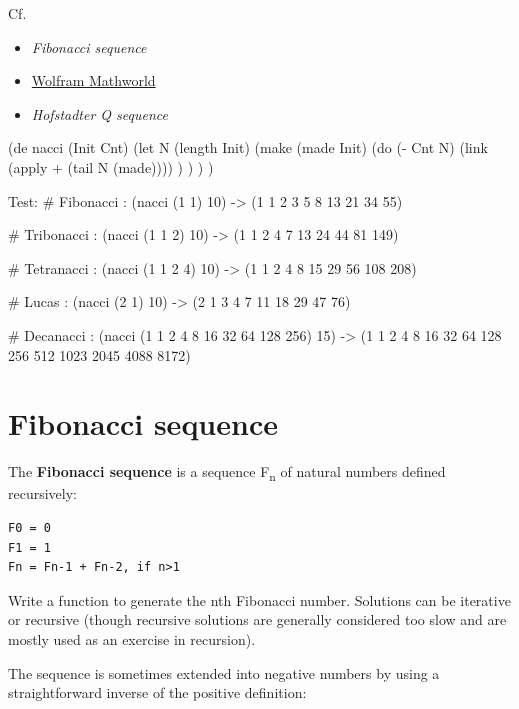 \begin{description}
\item[Cf.]
\end{description}

\begin{itemize}
\item \emph{Fibonacci sequence}
\item
  \href{http://mathworld.wolfram.com/Fibonaccin-StepNumber.html}{Wolfram
  Mathworld}
\item \emph{Hofstadter Q sequence‎}
\end{itemize}


\begin{wideverbatim}

(de nacci (Init Cnt)
   (let N (length Init)
      (make
         (made Init)
         (do (- Cnt N)
            (link (apply + (tail N (made)))) ) ) ) )

Test:
# Fibonacci
: (nacci (1 1) 10)
-> (1 1 2 3 5 8 13 21 34 55)

# Tribonacci
: (nacci (1 1 2) 10)
-> (1 1 2 4 7 13 24 44 81 149)

# Tetranacci
: (nacci (1 1 2 4) 10)
-> (1 1 2 4 8 15 29 56 108 208)

# Lucas
: (nacci (2 1) 10)
-> (2 1 3 4 7 11 18 29 47 76)

# Decanacci
: (nacci (1 1 2 4 8 16 32 64 128 256) 15)
-> (1 1 2 4 8 16 32 64 128 256 512 1023 2045 4088 8172)

\end{wideverbatim}

\pagebreak{}
\section*{Fibonacci sequence}

The \textbf{Fibonacci sequence} is a sequence F\textsubscript{n} of
natural numbers defined recursively:

\begin{verbatim}
F0 = 0
F1 = 1
Fn = Fn-1 + Fn-2, if n>1
\end{verbatim}

Write a function to generate the nth Fibonacci number. Solutions can be
iterative or recursive (though recursive solutions are generally
considered too slow and are mostly used as an exercise in recursion).

The sequence is sometimes extended into negative numbers by using a
straightforward inverse of the positive definition:


